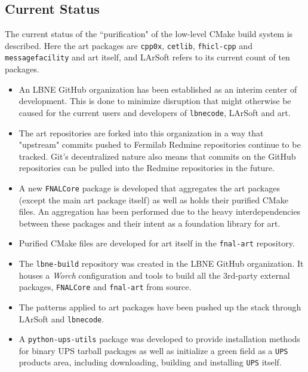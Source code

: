 \documentclass[usletter]{article}
\newcommand{\code}[1]{\texttt{#1}}
\newcommand{\worch}{\textit{Worch}\xspace}
\newcommand{\ups}{\code{UPS}\xspace}
\newcommand{\art}{art\xspace}
\newcommand{\larsoft}{LArSoft\xspace}
\newcommand{\lbnecode}{\code{lbnecode}\xspace}
\begin{document}
\subsection{Current Status}
The current status of the ``purification" of the low-level CMake build
system is described. Here the \art packages are \code{cpp0x}, \code{cetlib},
\code{fhicl-cpp} and \code{messagefacility} and \art itself, and \larsoft refers to
its current count of ten packages.
\begin{itemize}

\item An LBNE GitHub organization\cite{lbneghorg} has been established
  as an interim center of development.  This is done to minimize
  disruption that might otherwise be caused for the current users and
  developers of \lbnecode, \larsoft and \art.

\item The \art repositories are forked into this organization in a way
  that "upstream" commits pushed to Fermilab Redmine repositories
  continue to be tracked. Git's decentralized nature also means that
  commits on the GitHub repositories can be pulled into the Redmine
  repositories in the future.
  
\item A new \code{FNALCore} package\cite{fnalcoregh} is developed that
  aggregates the \art packages (except the main \art package itself)
  as well as holds their purified CMake files. An aggregation has been
  performed due to the heavy interdependencies between these packages
  and their intent as a foundation library for \art.

\item Purified CMake files are developed for \art itself in the
  \code{fnal-art} repository\cite{fnalartgh}.

\item The \code{lbne-build} repository\cite{lbnebuildgh} was created
  in the LBNE GitHub organization. It houses a \worch configuration
  and tools to build all the 3rd-party external packages,
  \code{FNALCore} and \code{fnal-art} from source.

\item The patterns applied to \art packages have been pushed up the
  stack through \larsoft and \lbnecode.

\item A \code{python-ups-utils} package\cite{urman} was developed to
  provide installation methods for binary UPS tarball packages as well
  as initialize a green field as a \ups products area, including
  downloading, building and installing \ups itself.


\end{itemize}
\end{document}
